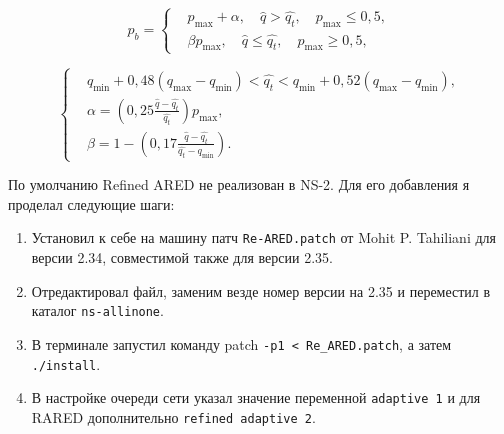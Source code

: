 \begin{equation}
\label{rf1}
p_{b} = \left\{
  \begin{aligned}
& p_{\max}+\alpha, \quad  \hat{q}>\hat{q_{t}}, \quad p_{\max} \leqslant 0,5, \\
& \beta p_{\max}, \quad \hat{q}\leqslant\hat{q_{t}}, \quad p_{\max} \geqslant 0,5,
  \end{aligned}
\right.
\end{equation}

\begin{equation}
\label{rf2}
\left\{
  \begin{aligned}
    & q_{\min}+0,48\left(q_{\max}-q_{\min}\right) < \hat{q_t} < q_{\min}+0,52\left(q_{\max}-q_{\min}\right), \\
    & \alpha=\left(0,25\frac{\hat{q}-\hat{q_t}}{\hat{q_t}} \right)p_{\max}, \\ 
    & \beta=1-\left(0,17\frac{\hat{q}-\hat{q_t}}{\hat{q_t}-q_{\min}}\right).
  \end{aligned}
\right.
\end{equation}


По умолчанию Refined ARED не реализован в NS-2. Для его добавления я
проделал следующие шаги:

\begin{enumerate}
\item Установил к себе на машину патч \verb|Re-ARED.patch| от Mohit
  P. Tahiliani для версии 2.34, совместимой также для версии 2.35.
\item Отредактировал файл, заменим везде номер версии на 2.35 и переместил в каталог \verb|ns-allinone|.
\item В терминале запустил команду patch \verb|-p1 < Re_ARED.patch|, а затем  \verb|./install|.
\item В настройке очереди сети указал значение переменной \verb|adaptive 1| и
  для RARED дополнительно \verb|refined adaptive 2|.
\end{enumerate}














